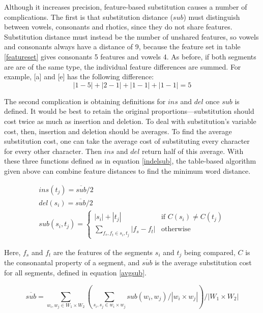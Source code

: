 \documentclass[11pt]{article}
\begin{document}
Although it increases precision, feature-based substitution causes a
number of complications. The first is that substitution distance
($sub$) must distinguish between vowels, consonants and rhotics, since
they do not share features. Substitution distance must instead be the
number of unshared features, so vowels and consonants always have a
distance of 9, because the feature set in table \ref{featureset} gives
consonants 5 features and vowels 4. As before, if both segments are
are of the same type, the individual feature differences are summed.  For
example, [a] and [e] has the following difference: \[ |1-5| + |2-1| +
|1-1| + |1-1| = 5 \]

The second complication is obtaining definitions for $ins$ and $del$
once $sub$ is defined. It would be best to retain the original
proportions---substitution should cost twice as much as insertion and
deletion. To deal with substitution's variable cost, then, insertion and
deletion should be averages. To find the average substitution cost, one can
 take the average cost of substituting every character
for every other character. Then $ins$ and $del$ return half of this
average. With these three functions defined as in equation
\ref{indelsub}, the table-based algorithm
given above can combine feature distances to find the minimum word distance.

\begin{equation}\begin{array}{l}
   ins(t_j) = \overline{sub} / 2 \\
   del(s_i) = \overline{sub} / 2 \\
   sub(s_i,t_j) = \left\{
     \begin{array}{ll}
       |s_i|+|t_j| & \textrm{if $C(s_i) \ne C(t_j)$} \\
       \sum_{f_s,f_t \in s_i,t_j} |f_s - f_t| & \textrm{otherwise}
     \end{array} \right.

   \end{array}
\label{indelsub}
\end{equation}

Here, $f_s$ and $f_t$ are the features of the segments $s_i$ and $t_j$
being compared, $C$ is the consonantal property of a segment, and
$\overline{sub}$ is the average substitution cost for all segments,
defined in equation \ref{avgsub}.

\begin{equation}
\overline{sub} = \sum_{w_i,w_j \in W_1\times W_2}(\sum_{s_i,s_j \in w_i
  \times w_j}sub(w_i,w_j) / |w_i\times w_j|) / |W_1\times W_2|
\label{avgsub}
\end{equation}
\end{document}
